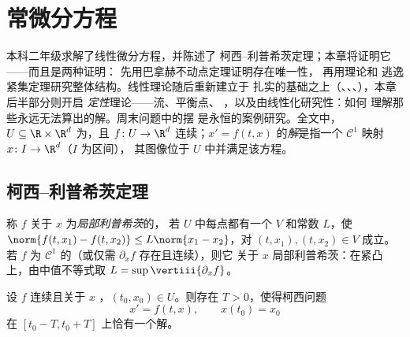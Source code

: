 \chapter{常微分方程}\label{ch:b3:ode}

本科二年级求解了线性微分方程，并陈述了
柯西--利普希茨定理；本章将证明它——而且是两种证明：
先用巴拿赫不动点定理证明存在唯一性，
再用理论和
逃逸紧集定理研究整体结构。线性理论随后重新建立于
扎实的基础之上（、、、），本章后半部分则开启
\emph{定性}理论——流、平衡点、
，以及由线性化研究性：如何
理解那些永远无法算出的解。周末问题中的摆
是永恒的案例研究。全文中，
$U \subseteq \R\times\R^d$ 为，且 $f \colon U \to \R^d$
连续；$x' = f(t, x)$ 的\emph{解}是指一个
$\mathcal C^1$ 映射 $x \colon I \to \R^d$（$I$ 为区间），
其图像位于 $U$ 中并满足该方程。

\section{柯西--利普希茨定理}

\begin{definition}\label{def:b3:ode:lipschitz}
称 $f$ 关于 $x$ 为\emph{局部利普希茨}的，
若 $U$ 中每点都有一个 $V$ 和常数
$L$，使 $\norm{f(t, x_1) - f(t, x_2)} \leq L\norm{x_1 -
x_2}$，对 $(t, x_1), (t, x_2) \in V$ 成立。若 $f$ 为 $\mathcal
C^1$ 的（或仅需 $\partial_xf$ 存在且连续），则它
关于 $x$ 局部利普希茨：在紧凸
上，由中值不等式取 $L =
\sup\vertiii{\partial_xf}$。
\end{definition}

\begin{theorem}[柯西--利普希茨，局部]
\label{thm:b3:ode:cauchylipschitz}
设 $f$ 连续且关于 $x$ ，$(t_0,
x_0) \in U$。则存在 $T > 0$，使得柯西问题
\[
x' = f(t, x), \qquad x(t_0) = x_0
\]
在 $[t_0 - T, t_0 +
T]$ 上恰有一个解。
\end{theorem}

